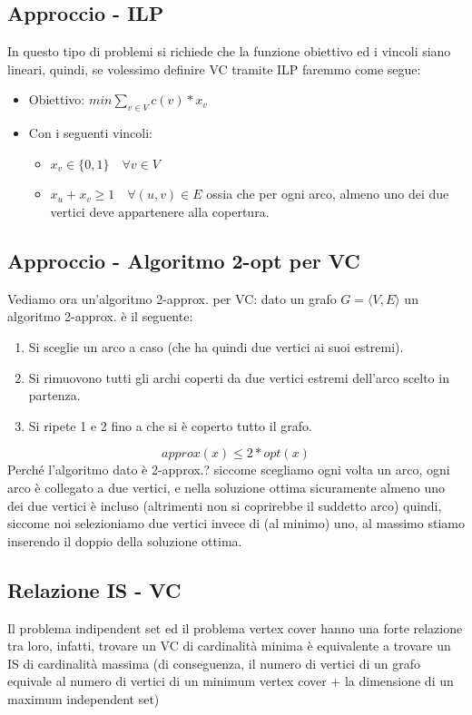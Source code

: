 \documentclass[12pt,a4paper]{article}
\begin{document}
\subsection{Approccio - ILP}
In questo tipo di problemi si richiede che la funzione obiettivo ed i vincoli siano lineari, quindi, se volessimo definire VC tramite ILP faremmo come segue:
\begin{itemize}
\item Obiettivo: $min \displaystyle\sum_{v \in V} c(v) * x_v$
\item Con i seguenti vincoli:
\begin{itemize}
\item $x_v \in \lbrace 0, 1 \rbrace \quad \forall v \in V$
\item $x_u + x_v \geqslant 1 \quad \forall (u, v) \in E$ ossia che per ogni arco, almeno uno dei due vertici deve appartenere alla copertura.
\end{itemize}
\end{itemize}

\subsection{Approccio - Algoritmo 2-opt per VC}
\label{vc_2-opt}Vediamo ora un'algoritmo 2-approx. per VC: dato un grafo $G = \langle V, E \rangle$ un algoritmo 2-approx. è il seguente:
\begin{enumerate}
\item Si sceglie un arco a caso (che ha quindi due vertici ai suoi estremi).
\item Si rimuovono tutti gli archi coperti da due vertici estremi dell'arco scelto in partenza.
\item Si ripete 1 e 2 fino a che si è coperto tutto il grafo.
\end{enumerate}
$$approx(x) \leqslant 2 * opt(x) $$
Perché l'algoritmo dato è 2-approx.? siccome scegliamo ogni volta un arco, ogni arco è collegato a due vertici, e nella soluzione ottima sicuramente almeno uno dei due vertici è incluso (altrimenti non si coprirebbe il suddetto arco) quindi, siccome noi selezioniamo due vertici invece di (al minimo) uno, al massimo stiamo inserendo il doppio della soluzione ottima.

\subsection{Relazione IS - VC}
\label{IS_VC}Il problema indipendent set ed il problema vertex cover hanno una forte relazione tra loro, infatti, trovare un VC di cardinalità minima è equivalente a trovare un IS di cardinalità massima (di conseguenza, il numero di vertici di un grafo equivale al numero di vertici di un minimum vertex cover + la dimensione di un maximum independent set)
\end{document}
